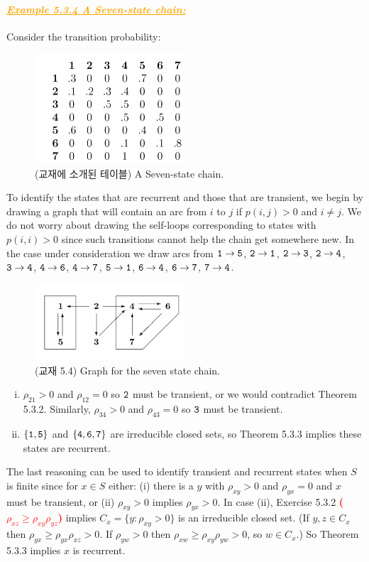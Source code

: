 \documentclass[12pt,oneside,english,a4paper]{article}
\newcommand{\paraorange}[1]{\paragraph{\LARGE\textcolor{orange}{\it\underline{\textbf{#1:}}}}\LARGE}
\begin{document}
\paraorange{Example 5.3.4 A Seven-state chain} Consider the transition probability:
\begin{figure}[ht]
\center
\includegraphics[width=0.5\textwidth]{Ex534table.png}
\caption{(교재에 소개된 테이블) A Seven-state chain.}
\end{figure}
To identify the states that are recurrent and those that are transient, we
begin by drawing a graph that will contain an arc from $i$ to $j$ if $p(i, j) > 0$ and $i \neq j$. We do not worry about drawing the self-loops corresponding to states with $p(i, i) > 0$ since such transitions cannot help the chain get somewhere new.
In the case under consideration we draw arcs from $\tt 1 \to 5$, $\tt 2 \to 1$, $\tt 2 \to 3$, $\tt 2 \to 4$, $\tt 3 \to 4$, $\tt 4 \to 6$, $\tt 4 \to 7$, $\tt 5 \to 1$, $\tt 6 \to 4$, $\tt 6 \to 7$, $\tt 7 \to 4$.
\begin{figure}[ht]
\center
\includegraphics[width=0.5\textwidth]{Fig54.png}
\caption{(교재 5.4) Graph for the seven state chain.}
\end{figure}
\begin{enumerate}[(i)]
\item $\rho_{21}>0$ and $\rho_{12}=0$ so $\tt 2$ must be transient, or we would contradict Theorem 5.3.2. Similarly, $\rho_{34} > 0$ and $\rho_{43}=0$ so $\tt 3$ must be transient.
\item $\tt \{1, 5\}$ and $\tt \{4, 6, 7\}$ are irreducible closed sets, so Theorem 5.3.3 implies these states are recurrent.
\end{enumerate}
The last reasoning can be used to identify transient and recurrent
states when $S$ is finite since for $x \in S$ either: (i) there is a $y$ with $\rho_{xy}> 0$ and $\rho_{yx}=0$ and $x$ must be transient, or (ii) $\rho_{xy}>0$ implies $\rho_{yx}>0$. In case (ii), Exercise 5.3.2 \textcolor{red}{\bf($\rho_{xz}\geq \rho_{xy}\rho_{yz}$)} implies $C_x = \{y : \rho_{xy} > 0\}$ is an irreducible closed set. (If $y, z \in C_x$ then $\rho_{yx}\geq \rho_{yx}\rho_{xz}>0$. If $\rho_{yw}>0$ then
$\rho_{xw}\geq \rho_{xy}\rho_{yw}>0$, so $w \in C_x$.) So Theorem 5.3.3 implies $x$ is recurrent.
\end{document}

